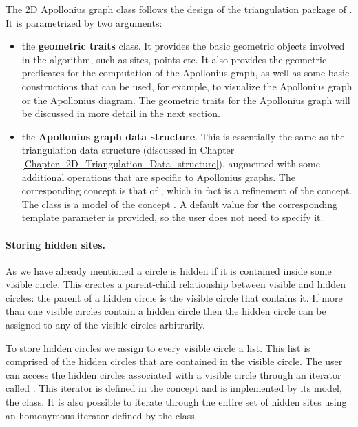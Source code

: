 The 2D Apollonius graph class
follows the design of the triangulation package of \cgal. It is
parametrized by two arguments:
\begin{itemize}
\item the {\bf geometric traits} class. It provides the basic
  geometric objects involved in the algorithm, such as sites, points
  etc. It also provides the geometric predicates for the computation
  of the Apollonius graph, as well as some basic constructions that
  can be used, for example, to visualize the Apollonius graph or the
  Apollonius diagram. The geometric traits for the Apollonius graph
  will be discussed in more detail in the next section.
\item the {\bf Apollonius graph data structure}. This is essentially
  the same as the triangulation data structure (discussed in Chapter
  \ref{Chapter_2D_Triangulation_Data_structure}), augmented with some
  additional operations that are specific to Apollonius graphs. The
  corresponding concept is that of
  , which in fact is a refinement
  of the  concept. The class
   is a model of
  the concept . A default value
  for the corresponding template parameter is provided, so the user
  does not need to specify it.
\end{itemize}

\paragraph{Storing hidden sites.}
As we have already mentioned a circle is hidden if it is contained
inside some visible circle. This creates a parent-child relationship
between visible and hidden circles: the parent of a hidden circle is the
visible circle that contains it. If more than one visible circles
contain a hidden circle then the hidden circle can be assigned to any of
the visible circles arbitrarily.

To store hidden circles we assign to every visible circle a list. This
list is comprised of the hidden circles that are contained in the
visible circle. The user can access the hidden circles associated with
a visible circle through an iterator called
. This iterator is defined in the
 concept and is implemented by its
model, the 
class. It is also possible to iterate through the entire set of hidden
sites using an homonymous iterator defined by the
 class. 

